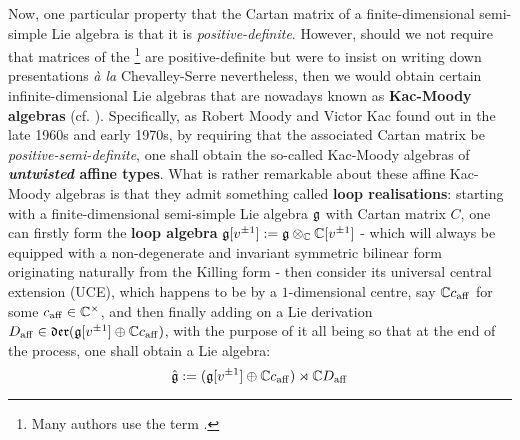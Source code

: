         Now, one particular property that the Cartan matrix of a finite-dimensional semi-simple Lie algebra is that it is \textit{positive-definite}. However, should we not require that matrices of the \footnote{Many authors use the term .} are positive-definite but were to insist on writing down presentations \textit{\`a la} Chevalley-Serre nevertheless, then we would obtain certain infinite-dimensional Lie algebras that are nowadays known as \textbf{Kac-Moody algebras} (cf. \cite[Chapter 1]{kac_infinite_dimensional_lie_algebras}). Specifically, as Robert Moody and Victor Kac found out in the late 1960s and early 1970s, by requiring that the associated Cartan matrix be \textit{positive-semi-definite}, one shall obtain the so-called Kac-Moody algebras of \textbf{\textit{untwisted} affine types}. What is rather remarkable about these affine Kac-Moody algebras is that they admit something called \textbf{loop realisations}: starting with a finite-dimensional semi-simple Lie algebra $\mathfrak{g}$ with Cartan matrix $C$, one can firstly form the \textbf{loop algebra} $\g[v^{\pm 1}] := \g \tensor_{\bbC} \bbC[v^{\pm 1}]$ - which will always be equipped with a non-degenerate and invariant symmetric bilinear form originating naturally from the Killing form - then consider its universal central extension (UCE), which happens to be by a $1$-dimensional centre, say $\mathbb{C} c_{\mathrm{aff}}$ for some $c_{\aff} \in \bbC^{\x}$, and then finally adding on a Lie derivation $D_{\mathrm{aff}} \in \mathfrak{der}(\mathfrak{g}[v^{\pm 1}] \oplus \mathbb{C} c_{\mathrm{aff}})$, with the purpose of it all being so that at the end of the process, one shall obtain a Lie algebra:
            $$\hat{\mathfrak{g}} := (\mathfrak{g}[v^{\pm 1}] \oplus \mathbb{C} c_{\mathrm{aff}}) \rtimes \mathbb{C} D_{\mathrm{aff}}$$
